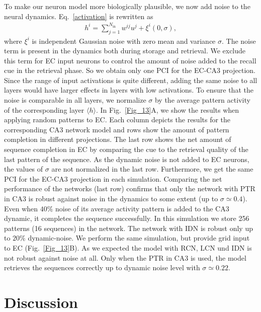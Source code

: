 \documentclass[utf8]{frontiersSCNS} %
\begin{document}
To make our neuron model more biologically plausible, we now add noise to the neural dynamics. Eq.~\ref{activation} is rewritten as
\begin{align}
\label{dynamic-noise}
h^i = \sum_{j=1}^{N_\mathrm{in}} w^{ij}u^j + \xi ^i (0,\sigma),
\end{align}  
where $\xi^i$ is independent Gaussian noise with zero mean and variance $\sigma$. The noise term is present in the dynamics both during storage and retrieval. We exclude this term for EC input neurons to control the amount of noise added to the recall cue in the retrieval phase. So we obtain only one PCI for the EC-CA3 projection. Since the range of input activations is quite different, adding the same noise to all layers would have larger effects in layers with low activations. To ensure that the noise is comparable in all layers, we normalize $ \sigma $ by the average pattern activity of the corresponding layer $\langle h \rangle$. 
In Fig.~\ref{Fig_13}A, we show the results when applying random patterns to EC. Each column depicts the results for the corresponding CA3 network model and rows show the amount of pattern completion in different projections. The last row shows the net amount of sequence completion in EC by comparing the cue to the retrieval quality of the last pattern of the sequence. 
As the dynamic noise is not added to EC neurons, the values of $ \sigma $ are not normalized in the last row. Furthermore, we get the same PCI for the EC-CA3 projection in each simulation.
Comparing the net performance of the networks (last row) confirms that only the network with PTR in CA3 is robust against noise in the dynamics to some extent (up to $\sigma \simeq 0.4$). Even when $ 40 \% $ noise of its average activity pattern is added to the CA3 dynamic, it completes the sequence successfully. In this simulation we store 256 patterns (16 sequences) in the network. The network with IDN is robust only up to $ 20 \% $ dynamic-noise.    
We perform the same simulation, but provide grid input to EC (Fig.~\ref{Fig_13}B). As we expected the model with RCN, LCN und IDN is not robust against noise at all. Only when the PTR in CA3 is used, the model retrieves the sequences correctly up to dynamic noise level with $\sigma \simeq 0.22$.


\section{Discussion}
\end{document}
